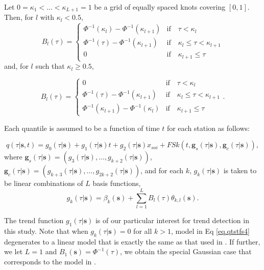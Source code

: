 \documentclass[fleqn,10pt]{wlscirep}
\newcommand{\bs}{\mathbf{s}}
\newcommand{\qtst}{q(\tau | \bs, t)}
\begin{document}
Let $0=\kappa_1<\ldots<\kappa_{L+1}=1$ be a grid of equally spaced knots covering $[0,1]$. Then, for $l$  with $\kappa_l<0.5$,
\[
B_l(\tau)=\begin{cases}
\Phi^{-1}(\kappa_l)-\Phi^{-1}(\kappa_{l+1}) & \text{if}\quad \tau < \kappa_l \\
\Phi^{-1}(\tau)-\Phi^{-1}(\kappa_{l+1}) &\text{if}\quad \kappa_l \leq \tau < \kappa_{l+1} \\
0 &\text{if}\quad  \kappa_{l+1} \leq \tau
\end{cases}\]
and, for $l$ such that $\kappa_l\geq 0.5$,

\[
B_l(\tau)=\begin{cases}
0 &\text{if}\quad \tau < \kappa_l \\
\Phi^{-1}(\tau)-\Phi^{-1}(\kappa_{l+1}) &\text{if}\quad \kappa_l \leq \tau < \kappa_{l+1} \\
\Phi^{-1}(\kappa_{l+1})-\Phi^{-1}(\kappa_{l}) &\text{if}\quad  \kappa_{l+1} \leq \tau
\end{cases}.\]

Each quantile is assumed to be a function of time $t$ for each station as follows:


\begin{equation}\label{eq.qtstfs4}
	\qtst=g_0(\tau| \bs)+ g_1(\tau|\bs)t + g_2(\tau|\bs) x_{soi} + FSk(t,\boldsymbol{g}_s(\tau|\bs),\boldsymbol{g}_c(\tau|\bs)),
\end{equation}
where $\boldsymbol{g}_s(\tau|\bs) = (g_3(\tau|\bs),\ldots,g_{k+2}(\tau|\bs))$, $\boldsymbol{g}_c(\tau|\bs) = (g_{k+3}(\tau|\bs),\ldots,g_{2k+2}(\tau|\bs))$, and for each $k$, $g_k(\tau|\bs)$ is taken to be linear combinations of $L$ basis functions,
\begin{equation}
	g_k(\tau|\bs) = \beta_k(\bs) +\sum_{l=1}^L B_l(\tau)\theta_{k,l}(\bs).
\end{equation}

The trend function  $g_1(\tau|\bs)$ is of our particular interest for trend detection in this study.  Note that when $g_k(\tau|\bs) = 0$ for all $k>1$, model in Eq \eqref{eq.qtstfs4} degenerates to a linear model that is exactly the same as that used in \cite{Brian2013}.  If further, we let $L=1$ and $B_1(\bs)=\Phi^{-1}(\tau)$,  we obtain the special Gaussian case that corresponds to the model in \cite{Chandler2005}.
\end{document}
